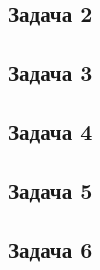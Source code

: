 \documentclass[a4paper]{article}
\begin{document}
\subsection*{Задача 2}
\subsection*{Задача 3}
\subsection*{Задача 4}
\subsection*{Задача 5}
\subsection*{Задача 6}
\end{document}

